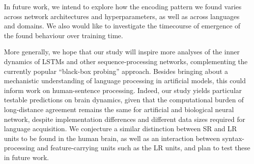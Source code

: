 In future work, we intend to explore how the encoding pattern we found varies across network architectures and hyperparameters, as well as across languages and domains. We also would like to investigate the timecourse of emergence of the found behaviour over training time.

More generally, we hope that our study will inspire more analyses of the inner dynamics of LSTMs and other sequence-processing networks, complementing the currently popular ``black-box probing'' approach. Besides bringing about a mechanistic understanding of language processing in artificial models, this could inform work on human-sentence processing. Indeed, our study yields particular testable predictions on brain dynamics, given that the computational burden of long-distance agreement remains the same for artificial and biological neural network, despite implementation differences and different data sizes required for language acquisition. We conjecture a similar distinction between SR and LR units to be found in the human brain, as well as an interaction between syntax-processing and feature-carrying units such as the LR units, and plan to test these in future work.
